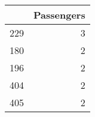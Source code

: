 \begin{tabular}{lr}
\toprule
{} &  Passengers \\
\midrule
229 &           3 \\
180 &           2 \\
196 &           2 \\
404 &           2 \\
405 &           2 \\
\bottomrule
\end{tabular}
